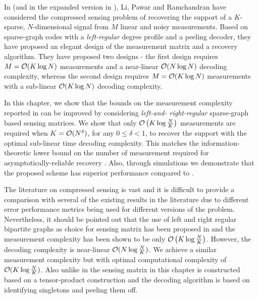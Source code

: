 In \cite{li2015subisit} (and in the expanded version in \cite{li2015subdraft}), Li, Pawar and Ramchandran have considered the compressed sensing problem of recovering the support of a $K$-sparse, $N$-dimensional signal from $M$ linear and noisy measurements. Based on sparse-graph codes with a \emph{left-regular} degree profile and a peeling decoder, they have proposed an elegant design of the measurement matrix and a recovery algorithm. They have proposed two designs - the first design requires $M = \mathcal{O}(K \log N)$ measurements and a near-linear $\mathcal{O}(N \log N)$ decoding complexity, whereas the second design requires $M = \mathcal{O}(K \log N)$ measurements with a sub-linear $\mathcal{O}(K \log N)$ decoding complexity.

In this chapter\cite{vem2016sub}, we show that the bounds on the measurement complexity reported in \cite{li2015subisit,li2015subdraft} can be improved by considering \emph{left-and- right-regular} sparse-graph based sensing matrices. We show that only $\mathcal{O}\left(K \log \frac{N}{K} \right)$ measurements are required when $K = \mathcal{O}(N^\delta)$, for any $0 \leq \delta < 1$, to recover the support with the optimal sub-linear time decoding complexity.  This matches the information-theoretic lower bound on the number of measurement required for asymptotically-reliable recovery \cite{wainwright2009information}. Also, through simulations we demonstrate that the proposed scheme has superior performance compared to \cite{li2015subdraft}.

The literature on compressed sensing is vast and it is difficult to provide a comparison with several of the existing results in the literature due to different error performance metrics being used for different versions of the problem. Nevertheless, it should be pointed out that the use of left and right regular bipartite graphs as choice for sensing matrix has been proposed in \cite{jafarpour2009efficient} and the measurement complexity has been shown to be only $\mathcal{O}\left(K \log \frac{N}{K} \right)$. However, the decoding complexity is near-linear $\mathcal{O}(N\log \frac{N}{K})$. We achieve a similar measurement complexity but with optimal computational complexity of $\mathcal{O}(K\log \frac{N}{K})$. Also unlike in \cite{jafarpour2009efficient} the sensing matrix in this chapter is constructed based on a tensor-product construction and the decoding algorithm is based on identifying singletons and peeling them off.

